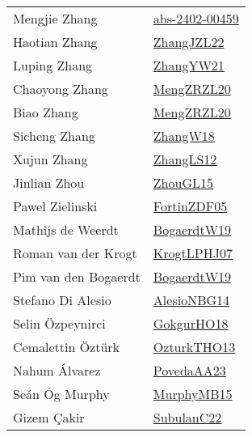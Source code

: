 {\begin{longtable}{p{4cm}p{20cm}}
Mengjie Zhang & \href{articles/abs-2402-00459.pdf}{abs-2402-00459}\cite{abs-2402-00459} \\
Haotian Zhang & \href{papers/ZhangJZL22.pdf}{ZhangJZL22}\cite{ZhangJZL22} \\
Luping Zhang & \href{articles/ZhangYW21.pdf}{ZhangYW21}\cite{ZhangYW21} \\
Chaoyong Zhang & \href{articles/MengZRZL20.pdf}{MengZRZL20}\cite{MengZRZL20} \\
Biao Zhang & \href{articles/MengZRZL20.pdf}{MengZRZL20}\cite{MengZRZL20} \\
Sicheng Zhang & \href{articles/ZhangW18.pdf}{ZhangW18}\cite{ZhangW18} \\
Xujun Zhang & \href{papers/ZhangLS12.pdf}{ZhangLS12}\cite{ZhangLS12} \\
Jinlian Zhou & \href{papers/ZhouGL15.pdf}{ZhouGL15}\cite{ZhouGL15} \\
Pawel Zielinski & \href{papers/FortinZDF05.pdf}{FortinZDF05}\cite{FortinZDF05} \\
Mathijs de Weerdt & \href{papers/BogaerdtW19.pdf}{BogaerdtW19}\cite{BogaerdtW19} \\
Roman van der Krogt & \href{papers/KrogtLPHJ07.pdf}{KrogtLPHJ07}\cite{KrogtLPHJ07} \\
Pim van den Bogaerdt & \href{papers/BogaerdtW19.pdf}{BogaerdtW19}\cite{BogaerdtW19} \\
Stefano {Di Alesio} & \href{papers/AlesioNBG14.pdf}{AlesioNBG14}\cite{AlesioNBG14} \\
Selin {\"{O}}zpeynirci & \href{}{GokgurHO18}\cite{GokgurHO18} \\
Cemalettin {\"{O}}zt{\"{u}}rk & \href{articles/OzturkTHO13.pdf}{OzturkTHO13}\cite{OzturkTHO13} \\
Nahum {\'{A}}lvarez & \href{papers/PovedaAA23.pdf}{PovedaAA23}\cite{PovedaAA23} \\
Se{\'{a}}n {\'{O}}g Murphy & \href{papers/MurphyMB15.pdf}{MurphyMB15}\cite{MurphyMB15} \\
Gizem {\c{C}}akir & \href{articles/SubulanC22.pdf}{SubulanC22}\cite{SubulanC22} \\
\end{longtable}
}

